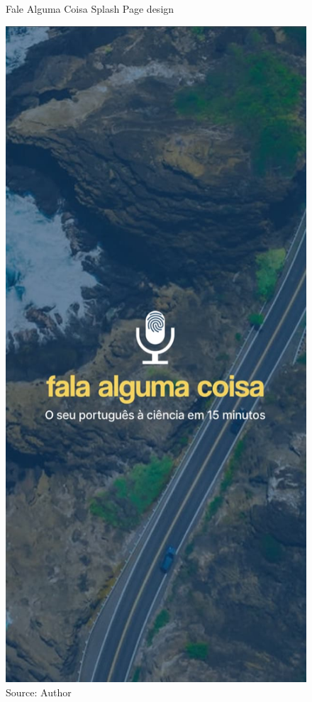 \begin{figure}[ht]
    \centering
    \caption{Fale Alguma Coisa Splash Page design}
    \includegraphics[width=\linewidth/2]{images/app/m-splash.jpg}
    \caption*{Source: Author}
    \label{fig:falealgumacoisa-splash-page-design}
\end{figure}

